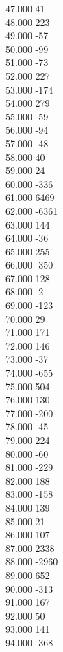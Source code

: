 { 47.000	41 \\
 48.000	223 \\
 49.000	-57 \\
 50.000	-99 \\
 51.000	-73 \\
 52.000	227 \\
 53.000	-174 \\
 54.000	279 \\
 55.000	-59 \\
 56.000	-94 \\
 57.000	-48 \\
 58.000	40 \\
 59.000	24 \\
 60.000	-336 \\
 61.000	6469 \\
 62.000	-6361 \\
 63.000	144 \\
 64.000	-36 \\
 65.000	255 \\
 66.000	-350 \\
 67.000	128 \\
 68.000	-2 \\
 69.000	-123 \\
 70.000	29 \\
 71.000	171 \\
 72.000	146 \\
 73.000	-37 \\
 74.000	-655 \\
 75.000	504 \\
 76.000	130 \\
 77.000	-200 \\
 78.000	-45 \\
 79.000	224 \\
 80.000	-60 \\
 81.000	-229 \\
 82.000	188 \\
 83.000	-158 \\
 84.000	139 \\
 85.000	21 \\
 86.000	107 \\
 87.000	2338 \\
 88.000	-2960 \\
 89.000	652 \\
 90.000	-313 \\
 91.000	167 \\
 92.000	50 \\
 93.000	141 \\
 94.000	-368 \\
}
